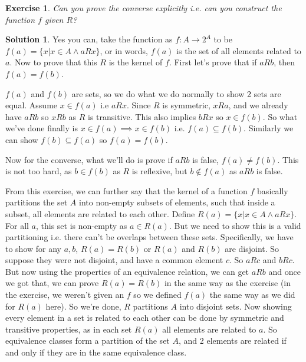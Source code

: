 \documentclass[a4paper,10pt]{article}
\newtheorem{exercise}{Exercise}[section]
\theoremstyle{definition} %
\newtheorem*{solution}{Solution}
\begin{document}
    \begin{exercise}
        Can you prove the converse explicitly i.e. can you construct the function $f$ given $R$?
    \end{exercise}
    
    \begin{solution}
        Yes you can, take the function as $f : A \rightarrow 2^A$ to be $f(a) =
        \{x|x \in A \land aRx\}$, or in words, $f(a)$ is the set of all elements related to $a$.
        Now to prove that this $R$ is the kernel of $f$. First let's prove that if 
        $aRb$, then $f(a) = f(b)$.
        
        $f(a)$ and $f(b)$ are sets, so we do what we do normally to show 2 sets are equal.
        Assume $x \in f(a)$ i.e $aRx$. Since $R$ is symmetric, $xRa$, and we already have 
        $aRb$ so $xRb$ as $R$ is transitive. This also implies $bRx$ so $x \in f(b)$. So what
        we've done finally is $x \in f(a) \implies x \in f(b)$ i.e. $f(a) \subseteq f(b)$. 
        Similarly we can show $f(b) \subseteq f(a)$ so $f(a) = f(b)$.
        
        Now for the converse, what we'll do is prove if $aRb$ is false, $f(a) \neq f(b)$.
        This is not too hard, as $b \in f(b)$ as $R$ is reflexive, but $b \notin f(a)$ as 
        $aRb$ is false.
    \end{solution}

    From this exercise, we can further say that the kernel of a function $f$ basically partitions
    the set $A$ into non-empty subsets of elements, such that inside a subset, all elements 
    are related to each other. Define $R(a) = \{x|x \in A \land aRx\}$. For all $a$, this 
    set is non-empty as $a \in R(a)$. But we need to show this is a valid partitioning i.e.
    there can't be overlaps between these sets. Specifically, we have to show for any $a, b$,
    $R(a) = R(b)$ or $R(a)$ and $R(b)$ are disjoint. So suppose they were not disjoint, and 
    have a common element $c$. So $aRc$ and $bRc$. But now using the properties of an equivalence
    relation, we can get $aRb$ and once we got that, we can prove $R(a) = R(b)$ in the same way as 
    the exercise (in the exercise, we weren't given an $f$ so we defined $f(a)$ the same way as we did
    for $R(a)$ here). So we're done, $R$ partitions $A$ into disjoint sets. Now showing every 
    element in a set is related to each other can be done by symmetric and transitive properties, 
    as in each set $R(a)$ all elements are related to $a$. So equivalence classes form a partition of the set $A$, and 2 elements are related if and only 
    if they are in the same equivalence class. 
\end{document}
